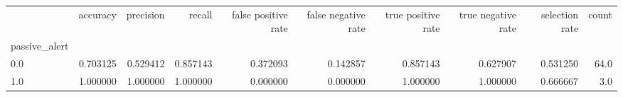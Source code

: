 \begin{tabular}{lrrrrrrrrr}
\toprule
{} &  accuracy &  precision &    recall &  false positive rate &  false negative rate &  true positive rate &  true negative rate &  selection rate &  count \\
passive\_alert &           &            &           &                      &                      &                     &                     &                 &        \\
\midrule
0.0           &  0.703125 &   0.529412 &  0.857143 &             0.372093 &             0.142857 &            0.857143 &            0.627907 &        0.531250 &   64.0 \\
1.0           &  1.000000 &   1.000000 &  1.000000 &             0.000000 &             0.000000 &            1.000000 &            1.000000 &        0.666667 &    3.0 \\
\bottomrule
\end{tabular}
